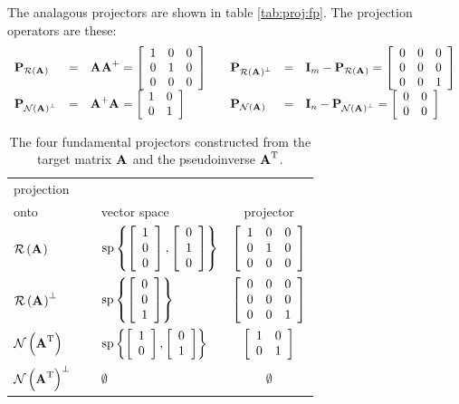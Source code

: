 The analagous projectors are shown in table \eqref{tab:proj:fp}. The projection operators are these:
\begin{equation}
  \begin{array}{lcllcl}
    \projra& = &\rightinv = \mat{ccc}{1&0&0\\0&1&0\\0&0&0} & \quad \projrap& = &\I{m}-\projra = \mat{ccc}{0&0&0\\0&0&0\\0&0&1}\\
    \projnap& =& \leftinv = \itwo & \quad \projna& = &\I{n}-\projnap = \mat{cc}{0&0\\0&0}\\    
  \end{array}
  \label{eq:primitives}
\end{equation}
\begin{table}[htdp]
\begin{center}
\begin{tabular}{llc}
 projection \\
 onto & \qquad vector space & projector\\\hline
 $\rng{\A{}}$  & $\spn\lst{\mat{c}{1\\0\\0},\mat{c}{0\\1\\0}}$ \qquad & $\mat{ccc}{1&0&0\\0&1&0\\0&0&0}$\\[19pt]\hline
 $\rng{\A{}}^{\perp}$ & $\spn\lst{\mat{c}{0\\0\\1}}$ & $\mat{ccc}{0&0&0\\0&0&0\\0&0&1}$ \\[19pt]\hline
 $\nll{\A{T}}\qquad $ & $\spn\lst{\mat{c}{1\\0},\mat{c}{0\\1}}$ & $\itwo$\\[13pt]\hline
 $\nll{\A{T}}^{\perp}$  & \qquad \qquad  $\emptyset$ & $\emptyset$\\[2pt]\hline
\end{tabular}
\end{center}
\label{tab:proj:fp}
\caption{The four fundamental projectors constructed from the target matrix $\A{}$ and the pseudoinverse $\A{T}$.}
\end{table}%


